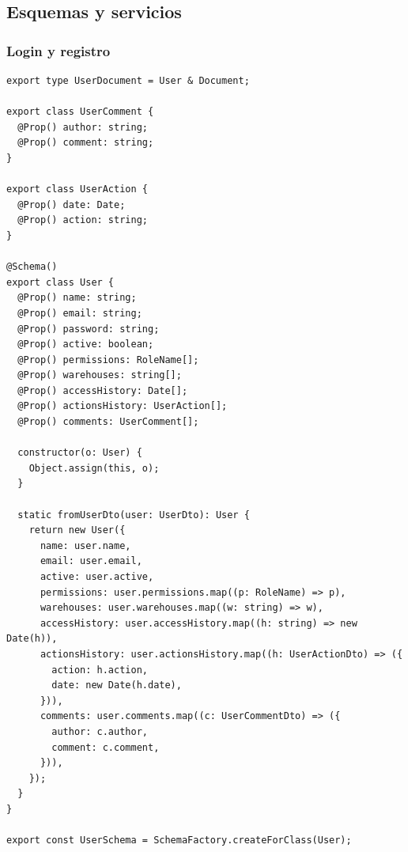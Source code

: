 \subsection{Esquemas y servicios}
\subsubsection{Login y registro}
\begin{lstlisting}[caption={User schema},label=cod:ddbb-user-schema]
export type UserDocument = User & Document;

export class UserComment {
  @Prop() author: string;
  @Prop() comment: string;
}

export class UserAction {
  @Prop() date: Date;
  @Prop() action: string;
}

@Schema()
export class User {
  @Prop() name: string;
  @Prop() email: string;
  @Prop() password: string;
  @Prop() active: boolean;
  @Prop() permissions: RoleName[];
  @Prop() warehouses: string[];
  @Prop() accessHistory: Date[];
  @Prop() actionsHistory: UserAction[];
  @Prop() comments: UserComment[];

  constructor(o: User) {
    Object.assign(this, o);
  }

  static fromUserDto(user: UserDto): User {
    return new User({
      name: user.name,
      email: user.email,
      active: user.active,
      permissions: user.permissions.map((p: RoleName) => p),
      warehouses: user.warehouses.map((w: string) => w),
      accessHistory: user.accessHistory.map((h: string) => new Date(h)),
      actionsHistory: user.actionsHistory.map((h: UserActionDto) => ({
        action: h.action,
        date: new Date(h.date),
      })),
      comments: user.comments.map((c: UserCommentDto) => ({
        author: c.author,
        comment: c.comment,
      })),
    });
  }
}

export const UserSchema = SchemaFactory.createForClass(User);
\end{lstlisting}

